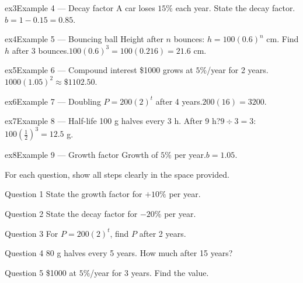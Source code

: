 \documentclass[11pt]{article}
\begin{document}
\begin{example}{ex3}{Example 4 --- Decay factor}
A car loses $15\%$ each year. State the decay factor.\soln $b=1-0.15=0.85$.
\end{example}

\begin{example}{ex4}{Example 5 --- Bouncing ball}
Height after $n$ bounces: $h=100(0.6)^n$ cm. Find $h$ after 3 bounces.\soln $100(0.6)^3=100(0.216)=21.6$ cm.
\end{example}

\begin{example}{ex5}{Example 6 --- Compound interest}
\$1000 grows at $5\%$/year for 2 years.\soln $1000(1.05)^2\approx\$1102.50$.
\end{example}

\begin{example}{ex6}{Example 7 --- Doubling}
$P=200(2)^t$ after 4 years.\soln $200(16)=3200$.
\end{example}

\begin{example}{ex7}{Example 8 --- Half-life}
100 g halves every 3 h. After 9 h?\soln $9\div3=3$: $100\left(\tfrac12\right)^3=12.5$ g.
\end{example}

\begin{example}{ex8}{Example 9 --- Growth factor}
Growth of $5\%$ per year.\soln $b=1.05$.
\end{example}

\clearpage
{}
For each question, show all steps clearly in the space provided.

\begin{qbox}{Question 1}
State the growth factor for $+10\%$ per year.\workspace{2.4cm}
\end{qbox}

\begin{qbox}{Question 2}
State the decay factor for $-20\%$ per year.\workspace{2.4cm}
\end{qbox}

\begin{qbox}{Question 3}
For $P=200(2)^t$, find $P$ after 2 years.\workspace{2.4cm}
\end{qbox}

\begin{qbox}{Question 4}
80 g halves every 5 years. How much after 15 years?\workspace{2.4cm}
\end{qbox}

\begin{qbox}{Question 5}
\$1000 at $5\%$/year for 3 years. Find the value.\workspace{2.4cm}
\end{qbox}
\end{document}
